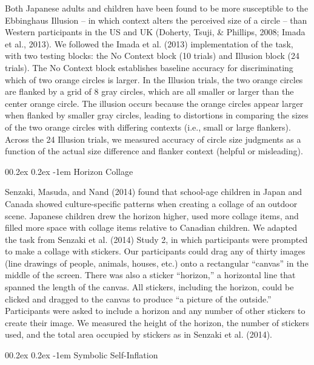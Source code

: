 \documentclass[
  man,floatsintext]{apa6}
\makeatletter
\let\oldparagraph\paragraph
\renewcommand{\paragraph}[1]{\oldparagraph{#1}\mbox{}}
\renewcommand{\paragraph}{\@startsection{paragraph}{4}{\parindent}%
  {0\baselineskip \@plus 0.2ex \@minus 0.2ex}%
  {-1em}%
  {\normalfont\normalsize\bfseries\itshape\typesectitle}}
\makeatother
\begin{document}
Both Japanese adults and children have been found to be more susceptible to the Ebbinghaus Illusion -- in which context alters the perceived size of a circle -- than Western participants in the US and UK (Doherty, Tsuji, \& Phillips, 2008; Imada et al., 2013). We followed the Imada et al. (2013) implementation of the task, with two testing blocks: the No Context block (10 trials) and Illusion block (24 trials). The No Context block establishes baseline accuracy for discriminating which of two orange circles is larger. In the Illusion trials, the two orange circles are flanked by a grid of 8 gray circles, which are all smaller or larger than the center orange circle. The illusion occurs because the orange circles appear larger when flanked by smaller gray circles, leading to distortions in comparing the sizes of the two orange circles with differing contexts (i.e., small or large flankers). Across the 24 Illusion trials, we measured accuracy of circle size judgments as a function of the actual size difference and flanker context (helpful or misleading).

\hypertarget{horizon-collage}{%
\paragraph{Horizon Collage}\label{horizon-collage}}

Senzaki, Masuda, and Nand (2014) found that school-age children in Japan and Canada showed culture-specific patterns when creating a collage of an outdoor scene. Japanese children drew the horizon higher, used more collage items, and filled more space with collage items relative to Canadian children. We adapted the task from Senzaki et al. (2014) Study 2, in which participants were prompted to make a collage with stickers. Our participants could drag any of thirty images (line drawings of people, animals, houses, etc.) onto a rectangular ``canvas'' in the middle of the screen. There was also a sticker ``horizon,'' a horizontal line that spanned the length of the canvas. All stickers, including the horizon, could be clicked and dragged to the canvas to produce ``a picture of the outside.'' Participants were asked to include a horizon and any number of other stickers to create their image. We measured the height of the horizon, the number of stickers used, and the total area occupied by stickers as in Senzaki et al. (2014).

\hypertarget{symbolic-self-inflation}{%
\paragraph{Symbolic Self-Inflation}\label{symbolic-self-inflation}}
\end{document}
